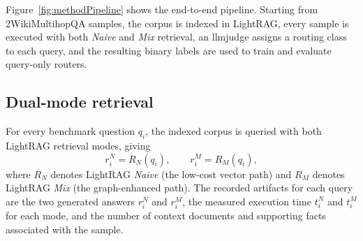 \documentclass[english, bibtex]{kththesis}               %
\numberwithin{listing}{chapter}
\begin{document}
Figure~\ref{fig:methodPipeline} shows the end-to-end pipeline. Starting from 2WikiMultihopQA samples, the corpus is indexed in LightRAG, every sample is executed with both \emph{Naive} and \emph{Mix} retrieval, an \gls{llmjudge} assigns a routing class to each query, and the resulting binary labels are used to train and evaluate query-only routers.

\subsection{Dual-mode retrieval}
\label{sec:methodDualMode}

For every benchmark question \(q_i\), the indexed corpus is queried with both LightRAG retrieval modes, giving
\begin{equation}
\label{eq:dualModeOutputs}
r_i^{N} = R_N(q_i),
\qquad
r_i^{M} = R_M(q_i),
\end{equation}
where \(R_N\) denotes LightRAG \emph{Naive} (the low-cost vector path) and \(R_M\) denotes LightRAG \emph{Mix} (the graph-enhanced path). The recorded artifacts for each query are the two generated answers \(r_i^N\) and \(r_i^M\), the measured execution time \(t_i^N\) and \(t_i^M\) for each mode, and the number of context documents and supporting facts associated with the sample.
\end{document}
